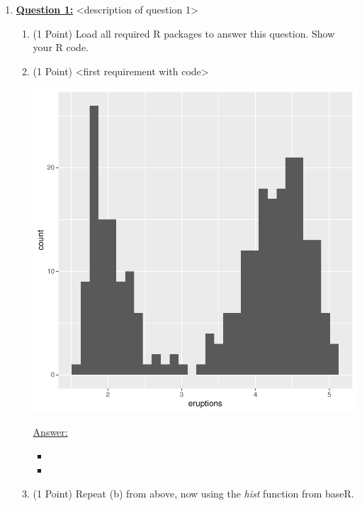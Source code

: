 \documentclass[12pt,letterpaper,final]{article}
\begin{document}
\begin{enumerate}

\item \underline{\bf Question 1:}
<description of question 1>


\begin{enumerate}
\item (1 Point) Load all required R packages to answer this question. Show your R code.






\item (1 Point) <first requirement with code>

\includegraphics{rnw_template-002}



\underline{Answer:}
\begin{itemize}
\item <Answer Part 1>
\item <Answer Part 2>
\end{itemize}





\item (1 Point) Repeat (b) from above, now using the {\it hist} function from baseR.


\end{enumerate}
\end{enumerate}
\end{document}
